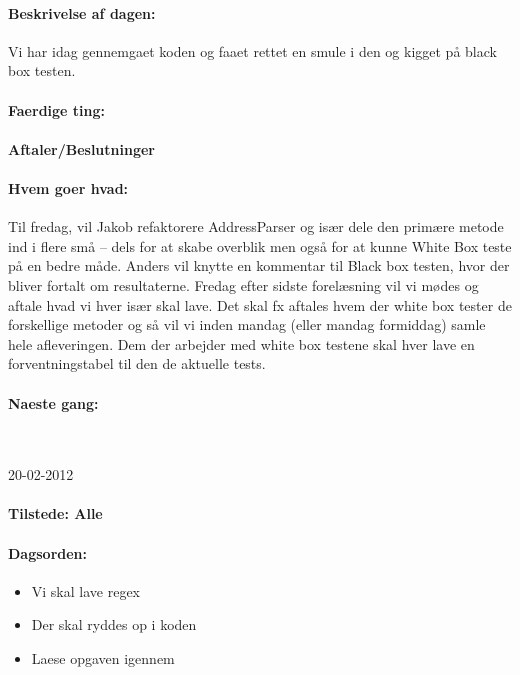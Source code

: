 \documentclass[a4paper,10pt,titlepage]{article}
\begin{document}
			\paragraph{Beskrivelse af dagen:}
			Vi har idag gennemgaet koden og faaet rettet en smule i den og kigget på black box testen.
			
			\paragraph{Faerdige ting:}
			
			\paragraph{Aftaler/Beslutninger}
			
			\paragraph{Hvem goer hvad:}
			Til fredag, vil Jakob refaktorere AddressParser og især dele den primære metode ind i flere små – dels for at skabe overblik men også for at kunne White Box teste på en bedre måde.
Anders vil knytte en kommentar til Black box testen, hvor der bliver fortalt om resultaterne.
Fredag efter sidste forelæsning vil vi mødes og aftale hvad vi hver især skal lave. Det skal fx aftales hvem der white box tester de forskellige metoder og så vil vi inden mandag (eller mandag formiddag) samle hele afleveringen.
Dem der arbejder med white box testene skal hver lave en forventningstabel til den de aktuelle tests.

			\paragraph{Naeste gang:}\mbox{}\\
			
			\begin{center}
		20-02-2012
		\end{center}
		\paragraph{Tilstede: Alle}
		\paragraph{Dagsorden:}
		\begin{itemize}
					\item Vi skal lave regex 
					\item Der skal ryddes op i koden
					\item Laese opgaven igennem
					 
		\end{itemize}
		
\end{document}
